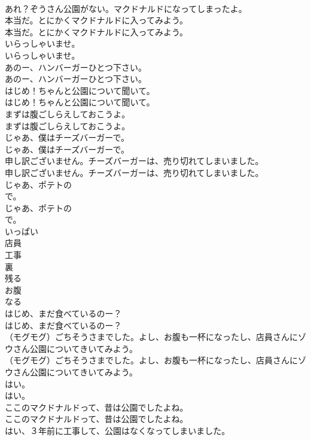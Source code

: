 \documentclass[8pt]{extreport}
\begin{document}
\begin{CJK}{UTF8}{min}
\\	あれ？ぞうさん公園がない。マクドナルドになってしまったよ。 
\\	本当だ。とにかくマクドナルドに入ってみよう。	
\\	本当だ。とにかくマクドナルドに入ってみよう。 
\\	いらっしゃいませ。	
\\	いらっしゃいませ。 
\\	あのー、ハンバーガーひとつ下さい。	
\\	あのー、ハンバーガーひとつ下さい。 
\\	はじめ！ちゃんと公園について聞いて。	
\\	はじめ！ちゃんと公園について聞いて。 
\\	まずは腹ごしらえしておこうよ。	
\\	まずは腹ごしらえしておこうよ。 
\\	じゃあ、僕はチーズバーガーで。	
\\	じゃあ、僕はチーズバーガーで。 
\\	申し訳ございません。チーズバーガーは、売り切れてしまいました。	
\\	申し訳ございません。チーズバーガーは、売り切れてしまいました。 
\\	じゃあ、ポテトの
\\	で。	
\\	じゃあ、ポテトの
\\	で。 
\\	いっぱい
\\	店員
\\	工事
\\	裏
\\	残る
\\	お腹
\\	なる
\\	はじめ、まだ食べているのー？	
\\	はじめ、まだ食べているのー？ 
\\	（モグモグ）ごちそうさまでした。よし、お腹も一杯になったし、店員さんにゾウさん公園についてきいてみよう。	
\\	（モグモグ）ごちそうさまでした。よし、お腹も一杯になったし、店員さんにゾウさん公園についてきいてみよう。 
\\	はい。	
\\	はい。 
\\	ここのマクドナルドって、昔は公園でしたよね。	
\\	ここのマクドナルドって、昔は公園でしたよね。 
\\	はい、３年前に工事して、公園はなくなってしまいました。	

\end{CJK}
\end{document}
